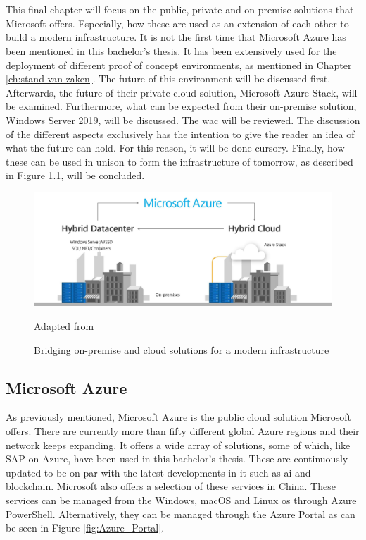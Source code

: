 \chapter{}
\label{ch:toekomstvisie}
This final chapter will focus on the public, private and on-premise solutions that Microsoft offers. 
Especially, how these are used as an extension of each other to build a modern infrastructure. 
It is not the first time that Microsoft Azure has been mentioned in this bachelor's thesis. 
It has been extensively used for the deployment of different proof of concept environments, as mentioned in Chapter \ref{ch:stand-van-zaken}. 
The future of this environment will be discussed first. 
Afterwards, the future of their private cloud solution, Microsoft Azure Stack, will be examined. 
Furthermore, what can be expected from their on-premise solution, Windows Server 2019, will be discussed. 
The \acrlong{wac} will be reviewed. 
The discussion of the different aspects exclusively has the intention to give the reader an idea of what the future can hold. 
For this reason, it will be done cursory.
Finally, how these can be used in unison to form the infrastructure of tomorrow, as described in Figure \ref{fig:Azure_FullCircle}, will be concluded.

\begin{figure}[h]
	\captionsetup{width=0.6\linewidth}
	\includegraphics[width=0.7\linewidth]{img/Toekomstvisie/Azure1.png}
	\centering
	\caption[Modern infrastructure]{Bridging on-premise and cloud solutions for a modern infrastructure}
	\scriptsize	
	Adapted from \cite{Singh2019}
	\label{fig:Azure_FullCircle}
\end{figure}

\clearpage

\section{Microsoft Azure}
As previously mentioned, Microsoft Azure is the public cloud solution Microsoft offers. 
There are currently more than fifty different global Azure regions and their network keeps expanding. 
It offers a wide array of solutions, some of which, like SAP on Azure, have been used in this bachelor's thesis. 
These are continuously updated to be on par with the latest developments in \acrshort{it} such as \acrfull{ai} and blockchain. 
Microsoft also offers a selection of these services in China. 
These services can be managed from the Windows, macOS  and Linux \acrshort{os} through Azure PowerShell. 
Alternatively, they can be managed through the Azure Portal as can be seen in Figure \ref{fig:Azure_Portal}.

